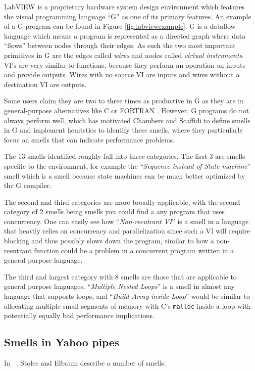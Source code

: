 \documentclass[10pt,conference,compsocconf]{IEEEtran}
\begin{document}
LabVIEW is a proprietary hardware system design environment which features the visual programming language ``G'' as one of its primary features.
An example of a G program can be found in Figure \ref{fig:labviewexample}.
G is a dataflow language which means a program is represented as a directed graph where data ``flows'' between nodes through their edges.
As such the two most important primitives in G are the edges called \textit{wires} and nodes called \textit{virtual instruments}.
VI's are very similar to functions, because they perform an operation on inputs and provide outputs.
Wires with no source VI are inputs and wires without a destination VI are outputs. 

Some users claim they are two to three times as productive in G as they are in general-purpose alternatives like C or FORTRAN \cite{chambers2013smell}.
However, G programs do not always perform well, which has motivated Chambers and Scaffidi \cite{chambers2013smell} to define smells in G and implement heuristics to identify these smells, where they particularly focus on smells that can indicate performance problems.

The 13 smells identified roughly fall into three categories.
The first 3 are smells specific to the environment, for example the ``\textit{Sequence instead of State machine}'' smell which is a smell because state machines can be much better optimized by the G compiler.

The second and third categories are more broadly applicable, with the second category of 2 smells being smells you could find a any program that uses concurrency.
One can easily see how ``\textit{Non-reentrant VI}'' is a smell in a language that heavily relies on concurrency and parallelization since such a VI will require blocking and thus possibly slows down the program, similar to how a non-reentrant function could be a problem in a concurrent program written in a general purpose language.

The third and largest category with 8 smells are those that are applicable to general purpose languages.
``\textit{Multiple Nested Loops}'' is a smell in almost any language that supports loops, and ``\textit{Build Array inside Loop}'' would be similar to allocating multiple small segments of memory with C's \texttt{malloc} inside a loop with potentially equally bad performance implications.

\subsection{Smells in Yahoo pipes}
In ~\cite{Stolee2011}, Stolee and Elbaum describe a number of smells. 
\end{document}
